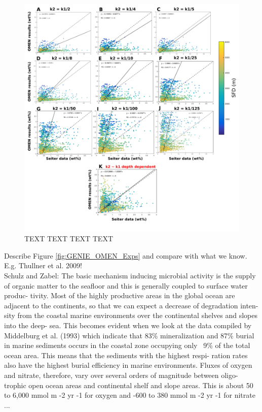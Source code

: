 \documentclass[gmd, manuscript]{copernicus}
\begin{document}
\begin{figure}[htbp]
\begin{center}
	\includegraphics[width=1.0\textwidth]{figures/OMEN-GENIE-Exp/0906_Boudreau97_5_5cm_CROSSPLOT_REGRESSION_no_title.pdf}
	\caption{TEXT TEXT TEXT TEXT}\label{fig:OMEN_GENIE_Boudreau_results}
\end{center}
\end{figure}

Describe Figure \ref{fig:GENIE_OMEN_Exps} and compare with what we know. E.g. Thullner et al. 2009! \\

Schulz and Zabel: 
The basic mechanism inducing microbial activity
is the supply of organic matter to the seafloor and
this is generally coupled to surface water produc-
tivity. Most of the highly productive areas in the
global ocean are adjacent to the continents, so 
that we can expect a decrease of degradation inten-
sity from the coastal marine environments over
the continental shelves and slopes into the deep-
sea. This becomes evident when we look at the
data compiled by Middelburg et al. (1993) which
indicate that 83\% mineralization and 87\% burial in
marine sediments occurs in the coastal zone
occupying only ~9\% of the total ocean area. This
means that the sediments with the highest respi-
ration rates also have the highest burial efficiency
in marine environments.
Fluxes of oxygen and nitrate, therefore, vary
over several orders of magnitude between oligo-
trophic open ocean areas and continental shelf and
slope areas. This is about 50 to 6,000 mmol m -2 yr -1
for oxygen and -600 to 380 mmol m -2 yr -1 for nitrate ...
\end{document}
